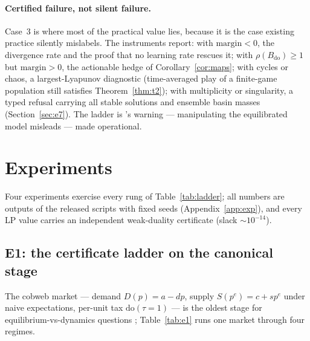 \documentclass[pmlr]{jmlr}
\newcommand{\doop}{\mathrm{do}}
\newcommand{\margin}{\mathrm{margin}}
\begin{document}
\paragraph{Certified failure, not silent failure.} Case~3 is where most of the practical value
lies, because it is the case existing practice silently mislabels. The instruments report: with
$\margin < 0$, the divergence rate and the proof that no learning rate rescues it; with
$\rho(B_{\doop}) \geq 1$ but $\margin > 0$, the actionable hedge of Corollary~\ref{cor:maps};
with cycles or chaos, a largest-Lyapunov diagnostic (time-averaged play of a finite-game
population still satisfies Theorem~\ref{thm:t2}); with multiplicity or singularity, a typed
refusal carrying all stable solutions and ensemble basin masses (Section~\ref{sec:e7}). The
ladder is \citet{dash2005restructuring}'s warning --- manipulating the equilibrated model
misleads --- made operational.

\section{Experiments}\label{sec:experiments}

Four experiments exercise every rung of Table~\ref{tab:ladder}; all numbers are outputs of the
released scripts with fixed seeds (Appendix~\ref{app:exp}), and every LP value carries an
independent weak-duality certificate (slack $\sim 10^{-14}$).

\subsection{E1: the certificate ladder on the canonical stage}\label{sec:e1}

The cobweb market --- demand $D(p) = a - dp$, supply $S(p^e) = c + s p^e$ under naive
expectations, per-unit tax $\doop(\tau{=}1)$ --- is the oldest stage for
equilibrium-vs-dynamics questions \citep{nerlove1958adaptive,hommes1994dynamics};
Table~\ref{tab:e1} runs one market through four regimes.
\end{document}
